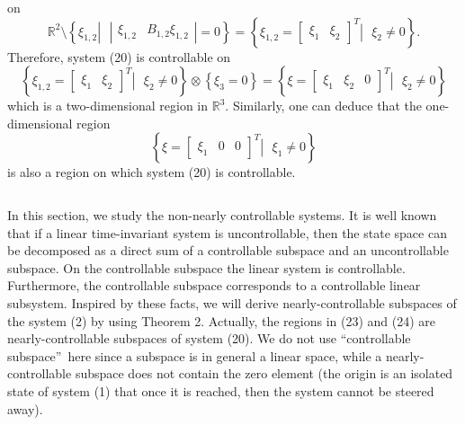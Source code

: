 \documentclass[journal,a4paper,12pt,onecolumn]{IEEEtran}
\begin{document}
on\begin{equation}
\mathbb{R}
^{2}\setminus \left\{ \xi _{1,2}\left\vert \text{ }\left\vert
\begin{array}{cc}
\xi _{1,2} & B_{1,2}\xi _{1,2}\end{array}\right\vert =0\right. \right\} =\left\{ \xi _{1,2}=\left[
\begin{array}{cc}
\xi _{1} & \xi _{2}\end{array}\right] ^{T}\left\vert \text{ }\xi _{2}\neq 0\right. \right\} .
\end{equation}Therefore, system (20) is controllable on\begin{equation}
\left\{ \xi _{1,2}=\left[
\begin{array}{cc}
\xi _{1} & \xi _{2}\end{array}\right] ^{T}\left\vert \text{ }\xi _{2}\neq 0\right. \right\} \otimes
\left\{ \xi _{3}=0\right\} =\left\{ \xi =\left[
\begin{array}{ccc}
\xi _{1} & \xi _{2} & 0\end{array}\right] ^{T}\left\vert \text{ }\xi _{2}\neq 0\right. \right\}
\end{equation}which is a two-dimensional region in $\mathbb{R}
^{3}$. Similarly, one can deduce that the one-dimensional region\begin{equation*}
\left\{ \xi =\left[
\begin{array}{ccc}
\xi _{1} & 0 & 0\end{array}\right] ^{T}\left\vert \text{ }\xi _{1}\neq 0\right. \right\}
\end{equation*}is also a region on which system (20) is controllable.

$\left. {}\right. $

In this section, we study the non-nearly controllable systems. It is well
known that if a linear time-invariant system is uncontrollable, then the
state space can be decomposed as a direct sum of a controllable subspace and
an uncontrollable subspace. On the controllable subspace the linear system
is controllable. Furthermore, the controllable subspace corresponds to a
controllable linear subsystem. Inspired by these facts, we will derive
nearly-controllable subspaces of the system (2) by using Theorem 2.
Actually, the regions in (23) and (24) are nearly-controllable subspaces of
system (20). We do not use \textquotedblleft controllable
subspace\textquotedblright\ here since a subspace is in general a linear
space, while a nearly-controllable subspace does not contain the zero
element (the origin is an isolated state of system (1) that once it is
reached, then the system cannot be steered away).
\end{document}
